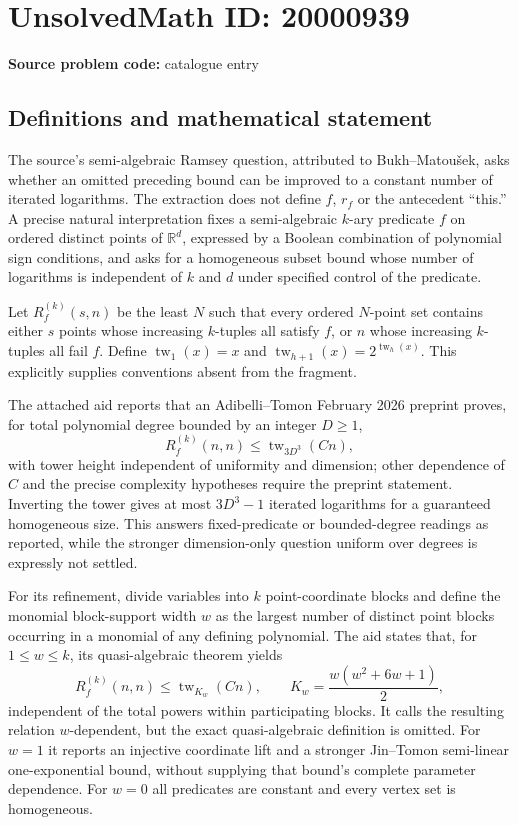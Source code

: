 \documentclass[11pt]{article}
\newcommand{\R}{\mathbb{R}}
\begin{document}
\section*{UnsolvedMath ID: 20000939}
\textbf{Source problem code:} catalogue entry
\subsection{Definitions and mathematical statement}
The source's semi-algebraic Ramsey question, attributed to Bukh--Matou\v{s}ek, asks whether an omitted preceding bound can be improved to a constant number of iterated logarithms. The extraction does not define $f$, $r_f$ or the antecedent ``this.'' A precise natural interpretation fixes a semi-algebraic $k$-ary predicate $f$ on ordered distinct points of $\R^d$, expressed by a Boolean combination of polynomial sign conditions, and asks for a homogeneous subset bound whose number of logarithms is independent of $k$ and $d$ under specified control of the predicate.

Let $R_f^{(k)}(s,n)$ be the least $N$ such that every ordered $N$-point set contains either $s$ points whose increasing $k$-tuples all satisfy $f$, or $n$ whose increasing $k$-tuples all fail $f$. Define $\operatorname{tw}_1(x)=x$ and $\operatorname{tw}_{h+1}(x)=2^{\operatorname{tw}_h(x)}$. This explicitly supplies conventions absent from the fragment.

The attached aid reports that an Adibelli--Tomon February 2026 preprint proves, for total polynomial degree bounded by an integer $D\ge1$,
\[
R_f^{(k)}(n,n)\le\operatorname{tw}_{3D^3}(C n),
\]
with tower height independent of uniformity and dimension; other dependence of $C$ and the precise complexity hypotheses require the preprint statement. Inverting the tower gives at most $3D^3-1$ iterated logarithms for a guaranteed homogeneous size. This answers fixed-predicate or bounded-degree readings as reported, while the stronger dimension-only question uniform over degrees is expressly not settled.

For its refinement, divide variables into $k$ point-coordinate blocks and define the monomial block-support width $w$ as the largest number of distinct point blocks occurring in a monomial of any defining polynomial. The aid states that, for $1\le w\le k$, its quasi-algebraic theorem yields
\[
R_f^{(k)}(n,n)\le\operatorname{tw}_{K_w}(C n),\qquad
K_w=\frac{w(w^2+6w+1)}2,
\]
independent of the total powers within participating blocks. It calls the resulting relation $w$-dependent, but the exact quasi-algebraic definition is omitted. For $w=1$ it reports an injective coordinate lift and a stronger Jin--Tomon semi-linear one-exponential bound, without supplying that bound's complete parameter dependence. For $w=0$ all predicates are constant and every vertex set is homogeneous.
\end{document}
